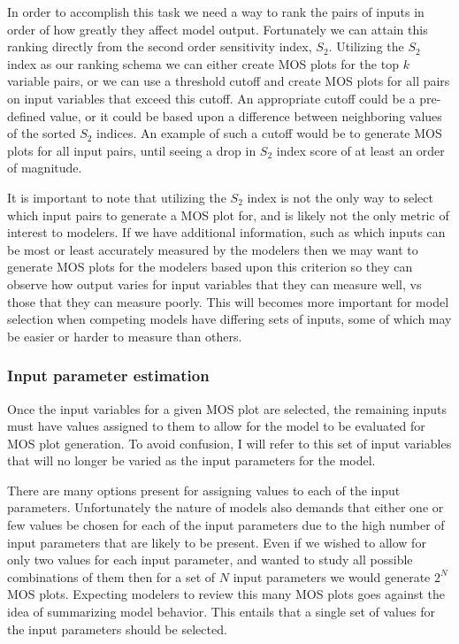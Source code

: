 In order to accomplish this task we need a way to rank the pairs of inputs in order of how greatly they affect model output. Fortunately we can attain this ranking directly from the second order sensitivity index, $S_2$. Utilizing the $S_2$ index as our ranking schema we can either create MOS plots for the top $k$ variable pairs, or we can use a threshold cutoff and create MOS plots for all pairs on input variables that exceed this cutoff. An appropriate cutoff could be a pre-defined value, or it could be based upon a difference between neighboring values of the sorted $S_2$ indices. An example of such a cutoff would be to generate MOS plots for all input pairs, until seeing a drop in $S_2$ index score of at least an order of magnitude.

It is important to note that utilizing the $S_2$ index is not the only way to select which input pairs to generate a MOS plot for, and is likely not the only metric of interest to modelers. If we have additional information, such as which inputs can be most or least accurately measured by the modelers then we may want to generate MOS plots for the modelers based upon this criterion so they can observe how output varies for input variables that they can measure well, vs those that they can measure poorly. This will becomes more important for model selection when competing models have differing sets of inputs, some of which may be easier or harder to measure than others.

\subsubsection{Input parameter estimation\label{sec:inp_param_est}}
Once the input variables for a given MOS plot are selected, the remaining inputs must have values assigned to them to allow for the model to be evaluated for MOS plot generation. To avoid confusion, I will refer to this set of input variables that will no longer be varied as the input parameters for the model.

There are many options present for assigning values to each of the input parameters. Unfortunately the nature of models also demands that either one or few values be chosen for each of the input parameters due to the high number of input parameters that are likely to be present. Even if we wished to allow for only two values for each input parameter, and wanted to study all possible combinations of them then for a set of $N$ input parameters we would generate $2^N$ MOS plots. Expecting modelers to review this many MOS plots goes against the idea of summarizing model behavior. This entails that a single set of values for the input parameters should be selected.

